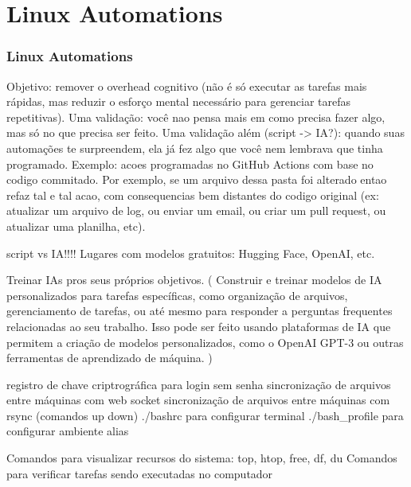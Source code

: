 \section{Linux Automations} %



\begin{frame}
  \frametitle{Linux Automations}

Objetivo: remover o overhead cognitivo (não é só executar as tarefas mais rápidas, mas reduzir o esforço mental necessário para gerenciar tarefas repetitivas).
Uma validação: você nao pensa mais em como precisa fazer algo, mas só no que precisa ser feito.
Uma validação além (script -> IA?): quando suas automações te surpreendem, ela já fez algo que você nem lembrava que tinha programado.
Exemplo: acoes programadas no GitHub Actions com base no codigo commitado. Por exemplo, se um arquivo dessa pasta foi alterado entao refaz tal e tal acao, com consequencias bem distantes do codigo original (ex: atualizar um arquivo de log, ou enviar um email, ou criar um pull request, ou atualizar uma planilha, etc).

script vs IA!!!!
Lugares com modelos gratuitos: Hugging Face, OpenAI, etc.

Treinar IAs pros seus próprios objetivos. 
( Construir e treinar modelos de IA personalizados para tarefas específicas, como organização de arquivos, gerenciamento de tarefas, ou até mesmo para responder a perguntas frequentes relacionadas ao seu trabalho. Isso pode ser feito usando plataformas de IA que permitem a criação de modelos personalizados, como o OpenAI GPT-3 ou outras ferramentas de aprendizado de máquina. )

registro de chave criptrográfica para login sem senha
sincronização de arquivos entre máquinas com web socket
sincronização de arquivos entre máquinas com rsync (comandos up down)
./bashrc para configurar terminal 
./bash_profile para configurar ambiente
alias

Comandos para visualizar recursos do sistema: top, htop, free, df, du
Comandos para verificar tarefas sendo executadas no computador



  \centering
  \renewcommand{\arraystretch}{1.15}
\end{frame}



